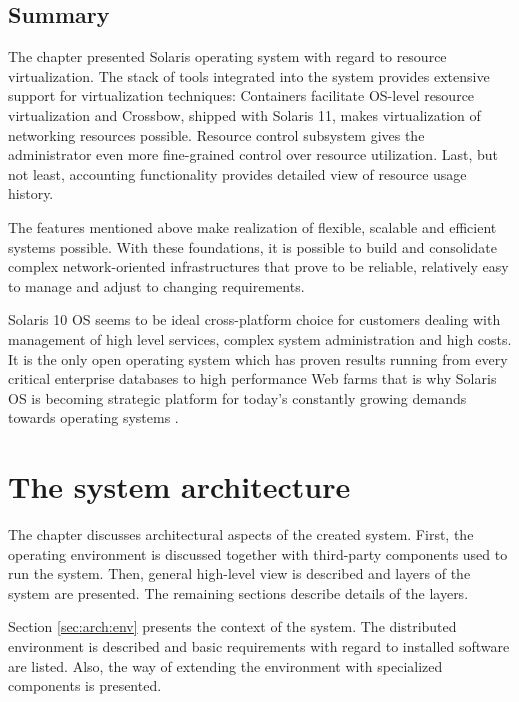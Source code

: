 \documentclass[11pt]{book}
\begin{document}
                

    \section*{Summary}

      The chapter presented Solaris operating system with regard to resource virtualization. The stack of tools
      integrated into the system provides extensive support for virtualization techniques: Containers facilitate
      OS-level resource virtualization and Crossbow, shipped with Solaris 11, makes virtualization of networking
      resources possible. Resource control subsystem gives the administrator even more fine-grained control over
      resource utilization. Last, but not least, accounting functionality provides detailed view of resource usage
      history.

      The features mentioned above make realization of flexible, scalable and efficient systems possible. With these
      foundations, it is possible to build and consolidate complex network-oriented infrastructures that prove to be
      reliable, relatively easy to manage and adjust to changing requirements.

      Solaris 10 OS seems to be ideal cross-platform choice for customers dealing with management of high level
      services, complex system administration and high costs. It is the only open operating system which has proven
      results running from every critical enterprise databases to high performance Web farms that is why Solaris OS is
      becoming strategic platform for today's constantly growing demands towards operating systems
      \cite{solaris_operating_system}. 


  \chapter{The system architecture}
  \label{chap:arch}

    The chapter discusses architectural aspects of the created system. First, the operating environment is discussed
    together with third-party components used to run the system. Then, general high-level view is described and
    layers of the system are presented. The remaining sections describe details of the layers.

    Section \ref{sec:arch:env} presents the context of the system. The distributed environment is described and
    basic requirements with regard to installed software are listed. Also, the way of extending the environment with
    specialized components is presented.
\end{document}

